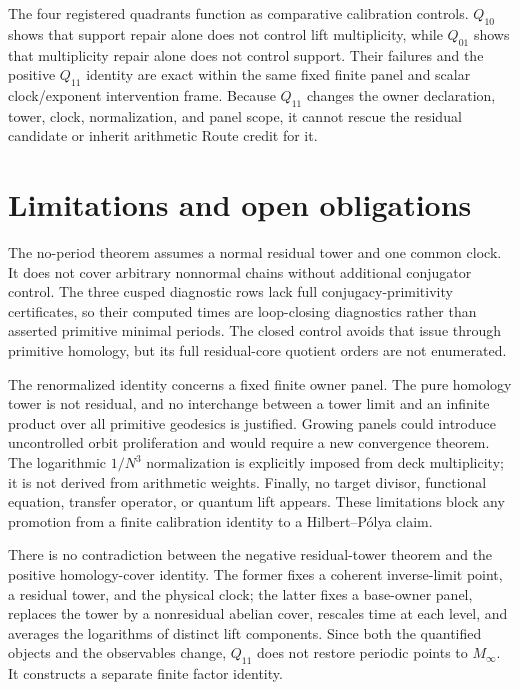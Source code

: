 \documentclass[11pt]{article}
\theoremstyle{definition}
\theoremstyle{remark}
\begin{document}
The four registered quadrants function as comparative calibration controls. $Q_{10}$ shows that support repair alone does not control lift multiplicity, while $Q_{01}$ shows that multiplicity repair alone does not control support. Their failures and the positive $Q_{11}$ identity are exact within the same fixed finite panel and scalar clock/exponent intervention frame. Because $Q_{11}$ changes the owner declaration, tower, clock, normalization, and panel scope, it cannot rescue the residual candidate or inherit arithmetic Route credit for it.

\section{Limitations and open obligations}

The no-period theorem assumes a normal residual tower and one common clock. It does not cover arbitrary nonnormal chains without additional conjugator control. The three cusped diagnostic rows lack full conjugacy-primitivity certificates, so their computed times are loop-closing diagnostics rather than asserted primitive minimal periods. The closed control avoids that issue through primitive homology, but its full residual-core quotient orders are not enumerated.

The renormalized identity concerns a fixed finite owner panel. The pure homology tower is not residual, and no interchange between a tower limit and an infinite product over all primitive geodesics is justified. Growing panels could introduce uncontrolled orbit proliferation and would require a new convergence theorem. The logarithmic $1/N^3$ normalization is explicitly imposed from deck multiplicity; it is not derived from arithmetic weights. Finally, no target divisor, functional equation, transfer operator, or quantum lift appears. These limitations block any promotion from a finite calibration identity to a Hilbert--Pólya claim.

There is no contradiction between the negative residual-tower theorem and the positive homology-cover identity. The former fixes a coherent inverse-limit point, a residual tower, and the physical clock; the latter fixes a base-owner panel, replaces the tower by a nonresidual abelian cover, rescales time at each level, and averages the logarithms of distinct lift components. Since both the quantified objects and the observables change, $Q_{11}$ does not restore periodic points to $M_\infty$. It constructs a separate finite factor identity.
\end{document}

